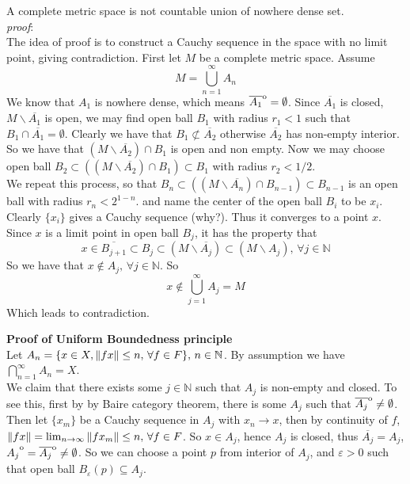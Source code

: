 \begin{theorem}\rm
	A complete metric space is not countable union of nowhere dense set.\\
	\textit{proof}:\\
	The idea of proof is to construct a Cauchy sequence in the space with no limit point, giving contradiction. First let $M$ be a complete metric space. Assume
	$$M=\bigcup_{n=1}^\infty A_n$$
	We know that $A_1$ is nowhere dense, which means $\overline{A_1}\strut^\mathrm{o}=\emptyset$. Since $\overline{A_1}$ is closed, $M\backslash \overline{A_1}$ is open, we may find open ball $B_1$ with radius $r_1<1$ such that $B_1\cap\overline{A_1}=\emptyset$. Clearly we have that $B_1\not\subset\overline{A_2}$ otherwise $\overline{A_2}$ has non-empty interior. So we have that $(M\backslash\overline{A_2})\cap B_1$ is open and non empty. Now we may choose open ball $B_2\subset((M\backslash\overline{A_2})\cap B_1)\subset B_1$ with radius $r_2<1/2$. \\
	We repeat this process, so that $B_n\subset((M\backslash\overline{A_n})\cap B_{n-1})\subset B_{n-1}$ is an  open ball with radius $r_n<2^{1-n}$. and name the center of the open ball $B_i$ to be $x_i$. Clearly $\{x_i\}$ gives a Cauchy sequence (why?). Thus it converges to a point $x$. Since $x$ is a limit point in open ball $B_j$, it has  the property that
	$$x\in \overline{B_{j+1}}\subset B_j\subset (M\backslash\overline{A_j})\subset(M\backslash A_j),\,\forall j\in\mathbb{N}$$
	So we have that $x\not\in A_j,\,\forall j\in\mathbb{N}$.
	So
	$$
		x\not\in \bigcup_{j=1}^{\infty}A_j=M
	$$
	Which leads to contradiction.
\end{theorem}
{\bf{Proof of Uniform Boundedness principle}}\\
Let $A_n=\{
	x\in X, \left\|{fx}\right\|\leq n,\,\forall f\in F
	\},\,n\in\mathbb{N}$. By assumption we have $\bigcap_{n=1}^\infty A_n=X$.\\
We claim that there exists some $j\in \mathbb{N}$ such that $A_j$ is non-empty and closed. To see this, first by by Baire category theorem, there is some $A_j$ such that $\overline{A_j}\strut^\mathrm{o}\not=\emptyset$. Then let $\{x_m\}$ be a Cauchy sequence in $A_j$ with $x_n\xrightarrow{}x$, then by continuity of $f$, $\left\|{fx}\right\|=\lim_{n\to\infty}\left\|{fx_m}\right\|\leq n,\,\forall f\in F$. So $x\in A_j$, hence $A_j$ is closed, thus $\overline{A_j}=A_j$, $A_j\strut^\mathrm{o}=\overline{A_j}\strut^\mathrm{o}\not=\emptyset$. So we can choose a point $p$ from interior of $A_j$, and $\varepsilon>0$ such that open ball $B_{\varepsilon}(p)\subseteq A_j$.\\
